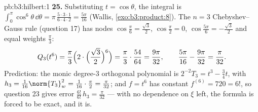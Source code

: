 \begin{solution}{pb:b3:hilbert:1}
\textbf{25.} Substituting $t = \cos\theta$, the integral is
$\int_0^\pi\cos^6\theta\,\dd\theta =
\pi\,\frac{5\cdot3\cdot1}{6\cdot4\cdot2} = \frac{5\pi}{16}$
(Wallis, \cref{exo:b3:product:8}). The $n = 3$
Chebyshev--Gauss rule (question 17) has nodes
$\cos\frac\pi6 = \frac{\sqrt3}2$, $\cos\frac\pi2 = 0$,
$\cos\frac{5\pi}6 = -\frac{\sqrt3}2$ and equal weights
$\frac\pi3$:
\[
Q_3(t^6) = \frac\pi3\Bigl(2\cdot\Bigl(\frac{\sqrt3}2
\Bigr)^{6}\Bigr) = \frac\pi3\cdot\frac{54}{64}
= \frac{9\pi}{32},
\qquad
\frac{5\pi}{16} - \frac{9\pi}{32} = \frac\pi{32} .
\]
Prediction: the monic degree-$3$ orthogonal polynomial is
$2^{-2}T_3 = t^3 - \frac34t$, with $h_3 =
\frac1{16}\norm{T_3}_w^2 = \frac1{16}\cdot\frac\pi2 =
\frac\pi{32}$; and $f = t^6$ has constant $f^{(6)} = 720 =
6!$, so question 23 gives error $\frac{6!}{6!}\,h_3 =
\frac\pi{32}$ --- with no dependence on $\xi$ left, the
formula is forced to be exact, and it is.
\end{solution}
